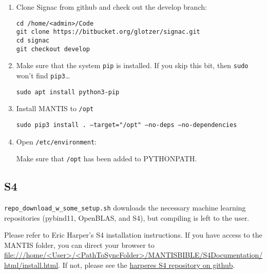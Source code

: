\begin{enumerate}
  \item Clone Signac from github and check out the develop branch:

    \texttt{cd /home/<admin>/Code} \\
    \texttt{git clone https://bitbucket.org/glotzer/signac.git} \\
    \texttt{cd signac} \\
    \texttt{git checkout develop}

  \item Make sure that the system \texttt{pip} is installed. If you skip this bit, then \texttt{sudo} won't find \texttt{pip3}\dots

    \texttt{sudo apt install python3-pip}

  \item Install MANTIS to \texttt{/opt}

    \texttt{sudo pip3 install . --target="/opt" --no-deps --no-dependencies}

  \item Open \texttt{/etc/environment}:
	
    Make sure that \texttt{/opt} has been added to PYTHONPATH.
\end{enumerate}

\subsection{S4} \label{subsec:S4compiling}

\texttt{repo\_download\_w\_some\_setup.sh} downloads the necessary machine learning repositories (pybind11, OpenBLAS, and S4), but compiling is left to the user.

Please refer to Eric Harper's S4 installation instructions. If you have access to the MANTIS folder, you can direct your browser to \url{file:///home/<User>/<PathToSyncFolder>/MANTISBIBLE/S4Documentation/html/install.html}. If not, please see the \href{https://github.com/harperes/S4}{harperes S4 repository on github}.
